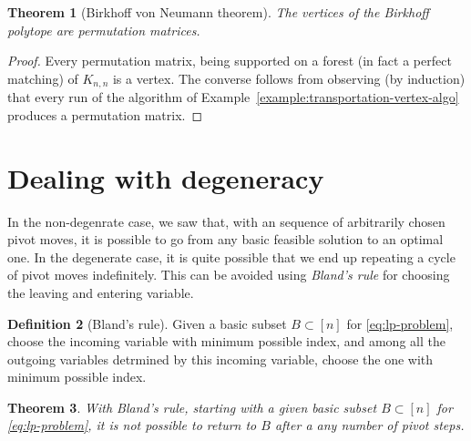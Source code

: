 \documentclass{amsbook}
\newtheorem{theorem}{Theorem}[section]
\theoremstyle{definition}
\newtheorem{definition}[theorem]{Definition}
\theoremstyle{remark}
\begin{document}
\begin{theorem}
  [Birkhoff von Neumann theorem]
  The vertices of the Birkhoff polytope are permutation matrices.
\end{theorem}
\begin{proof}
  Every permutation matrix, being supported on a forest (in fact a perfect matching) of $K_{n,n}$ is a vertex.
  The converse follows from observing (by induction) that every run of the algorithm of Example~\ref{example:transportation-vertex-algo} produces a permutation matrix.
\end{proof}
\section{Dealing with degeneracy}
\label{sec:deal-with-degen}
In the non-degenrate case, we saw that, with an sequence of arbitrarily chosen pivot moves, it is possible to go from any basic feasible solution to an  optimal one.
In the degenerate case, it is quite possible that we end up repeating a cycle of pivot moves indefinitely.
This can be avoided using \emph{Bland's rule} for choosing the leaving and entering variable.
\begin{definition}
  [Bland's rule]
  Given a basic subset $B\subset [n]$ for \eqref{eq:lp-problem}, choose the incoming variable with minimum possible index, and among all the outgoing variables detrmined by this incoming variable, choose the one with minimum possible index.
\end{definition}
\begin{theorem}
  With Bland's rule, starting with a given basic subset $B\subset [n]$ for \eqref{eq:lp-problem}, it is not possible to return to $B$ after a any number of pivot steps.
\end{theorem}
\end{document}
